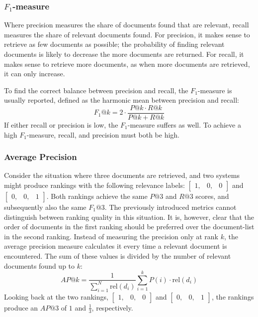 \subsubsection{$F_1$-measure}
Where precision measures the share of documents found that are relevant, recall measures the share of relevant documents found. For precision, it makes sense to retrieve as few documents as possible; the probability of finding relevant documents is likely to decrease the more documents are returned. For recall, it makes sense to retrieve more documents, as when more documents are retrieved, it can only increase.  

To find the correct balance between precision and recall, the $F_1$-measure is usually reported, defined as the harmonic mean between precision and recall:
\begin{equation}
	\textit{F}_1@\textit{k}  = 2\cdot\frac{P@k \cdot R@k}{P@k + R@k} 
\end{equation}
If either recall or precision is low, the $F_1$-measure suffers as well. To achieve a high $F_1$-measure, recall, and precision must both be high.

\subsubsection{Average Precision}
Consider the situation where three documents are retrieved, and two systems might produce rankings with the following relevance labels: $\left[
\begin{smallmatrix}
	1, & 0, & 0
\end{smallmatrix}
\right]$ and $\left[
\begin{smallmatrix}
	0, & 0, & 1
\end{smallmatrix}
\right]$.
Both rankings achieve the same $P@3$ and $R@3$ scores, and subsequently also the same $F_1@3$. The previously introduced metrics cannot distinguish between ranking quality in this situation. It is, however, clear that the order of documents in the first ranking should be preferred over the document-list in the second ranking. 
Instead of measuring the precision only at rank $k$, the average precision measure calculates it every time a relevant document is encountered. The sum of these values is divided by the number of relevant documents found up to $k$:
\begin{equation}
	\textit{AP}@k = \frac{1}{\sum_{i=1}^N\text{rel}\left(d_i\right)}\sum^k_{i=1} P\left(i\right) \cdot \text{rel}\left(d_i\right)
\end{equation}
Looking back at the two rankings, 
$\left[
\begin{smallmatrix}
	1, & 0, & 0
\end{smallmatrix}
\right]$ and $\left[
\begin{smallmatrix}
	0, & 0, & 1
\end{smallmatrix}
\right]$, the rankings produce an $\textit{AP}@3$ of $1$ and $\frac{1}{3}$, respectively.

